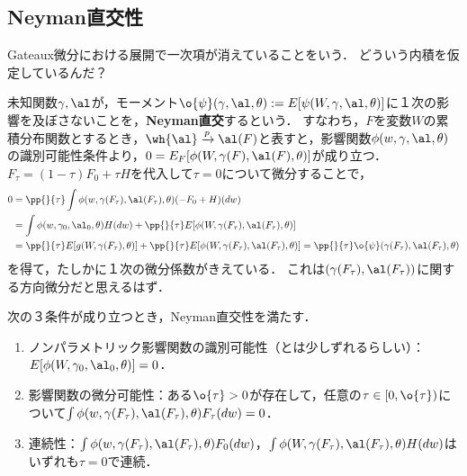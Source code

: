 \documentclass[uplatex,dvipdfmx]{jsreport}
\begin{document}
\subsection{Neyman直交性}

\begin{tcolorbox}[colframe=ForestGreen, colback=ForestGreen!10!white,breakable,colbacktitle=ForestGreen!40!white,coltitle=black,fonttitle=\bfseries\sffamily,
title=]
    Gateaux微分における展開で一次項が消えていることをいう．
    どういう内積を仮定しているんだ？
\end{tcolorbox}

\begin{definition}
    未知関数$\gamma,\al$が，モーメント$\o{\psi}(\gamma,\al,\theta):=E[\psi(W,\gamma,\al,\theta)]$に１次の影響を及ぼさないことを，\textbf{Neyman直交}するという．
    すなわち，$F$を変数$W$の累積分布関数とするとき，$\wh{\al}\xrightarrow{p}\al(F)$と表すと，影響関数$\phi(w,\gamma,\al,\theta)$の識別可能性条件より，$0=E_F[\phi(W,\gamma(F),\al(F),\theta)]$が成り立つ．
    $F_\tau=(1-\tau)F_0+\tau H$を代入して$\tau=0$について微分することで，
    \begin{align*}
        0&=\pp{}{\tau}\int\phi(w,\gamma(F_\tau),\al(F_\tau),\theta)(-F_0+H)(dw)\\
        &=\int\phi(w,\gamma_0,\al_0,\theta)H(dw)+\pp{}{\tau}E[\phi(W,\gamma(F_\tau),\al(F_\tau),\theta)]\\
        &=\pp{}{\tau}E[g(W,\gamma(F_\tau),\theta)]+\pp{}{\tau}E[\phi(W,\gamma(F_\tau),\al(F_\tau),\theta)]=\pp{}{\tau}\o{\psi}(\gamma(F_\tau),\al(F_\tau),\theta)
    \end{align*}
    を得て，たしかに１次の微分係数がきえている．
    これは$(\gamma(F_\tau),\al(F_\tau))$に関する方向微分だと思えるはず．
\end{definition}

\begin{theorem}
    次の３条件が成り立つとき，Neyman直交性を満たす．
    \begin{enumerate}
        \item ノンパラメトリック影響関数の識別可能性（とは少しずれるらしい）：$E[\phi(W,\gamma_0,\al_0,\theta)]=0$．
        \item 影響関数の微分可能性：ある$\o{\tau}>0$が存在して，任意の$\tau\in[0,\o{\tau})$について$\int\phi(w,\gamma(F_\tau),\al(F_\tau),\theta)F_\tau(dw)=0$．
        \item 連続性：$\int\phi(w,\gamma(F_\tau),\al(F_\tau),\theta)F_0(dw)$，$\int\phi(W,\gamma(F_\tau),\al(F_\tau),\theta)H(dw)$はいずれも$\tau=0$で連続．
    \end{enumerate}
\end{theorem}
\end{document}
